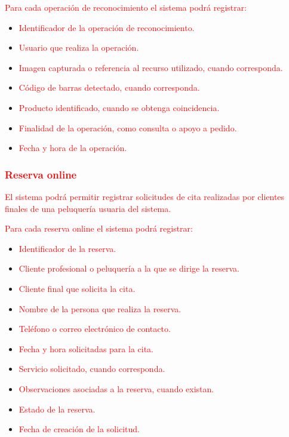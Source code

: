 \textcolor{red}{Para cada operación de reconocimiento el sistema podrá registrar:}

\begin{itemize}
    \item \textcolor{red}{Identificador de la operación de reconocimiento.}
    \item \textcolor{red}{Usuario que realiza la operación.}
    \item \textcolor{red}{Imagen capturada o referencia al recurso utilizado, cuando corresponda.}
    \item \textcolor{red}{Código de barras detectado, cuando corresponda.}
    \item \textcolor{red}{Producto identificado, cuando se obtenga coincidencia.}
    \item \textcolor{red}{Finalidad de la operación, como consulta o apoyo a pedido.}
    \item \textcolor{red}{Fecha y hora de la operación.}
\end{itemize}

\subsubsection*{\textcolor{red}{Reserva online}}

\textcolor{red}{El sistema podrá permitir registrar solicitudes de cita realizadas por clientes finales de una peluquería usuaria del sistema.}

\textcolor{red}{Para cada reserva online el sistema podrá registrar:}

\begin{itemize}
    \item \textcolor{red}{Identificador de la reserva.}
    \item \textcolor{red}{Cliente profesional o peluquería a la que se dirige la reserva.}
    \item \textcolor{red}{Cliente final que solicita la cita.}
    \item \textcolor{red}{Nombre de la persona que realiza la reserva.}
    \item \textcolor{red}{Teléfono o correo electrónico de contacto.}
    \item \textcolor{red}{Fecha y hora solicitadas para la cita.}
    \item \textcolor{red}{Servicio solicitado, cuando corresponda.}
    \item \textcolor{red}{Observaciones asociadas a la reserva, cuando existan.}
    \item \textcolor{red}{Estado de la reserva.}
    \item \textcolor{red}{Fecha de creación de la solicitud.}
\end{itemize}
